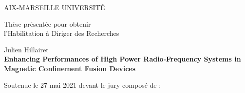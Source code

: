 \begin{flushleft}
  \vspace{0.2cm}
  \LARGE AIX-MARSEILLE UNIVERSIT\'E\\
  \vspace{0.2cm}
  \vspace{0.2cm}
  \begin{center}
    \vspace{3.8cm}
    Th\`ese pr\'esent\'ee pour obtenir\\l'Habilitation \`a Diriger des Recherches\\
  \end{center}
  \vspace{0.5cm}
  \begin{center}
    \vspace{0.4cm}
    \Large Julien Hillairet\\
    \vspace{1cm}
    \LARGE\textbf{Enhancing Performances of High Power Radio-Frequency Systems in Magnetic Confinement Fusion Devices}\\
    \vspace{0.5cm}
  \end{center}
  \vspace{1cm}
  \normalsize Soutenue le 27 mai 2021 devant le jury compos\'e de :\\
\end{flushleft}
\vspace{0.4cm}
